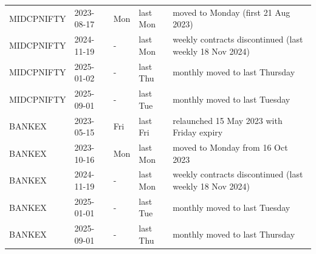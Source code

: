 \begin{tabular}{llllp{6.2cm}}
MIDCPNIFTY & 2023-08-17 & Mon & last Mon & moved to Monday (first 21 Aug 2023) \\
MIDCPNIFTY & 2024-11-19 & - & last Mon & weekly contracts discontinued (last weekly 18 Nov 2024) \\
MIDCPNIFTY & 2025-01-02 & - & last Thu & monthly moved to last Thursday \\
MIDCPNIFTY & 2025-09-01 & - & last Tue & monthly moved to last Tuesday \\
BANKEX & 2023-05-15 & Fri & last Fri & relaunched 15 May 2023 with Friday expiry \\
BANKEX & 2023-10-16 & Mon & last Mon & moved to Monday from 16 Oct 2023 \\
BANKEX & 2024-11-19 & - & last Mon & weekly contracts discontinued (last weekly 18 Nov 2024) \\
BANKEX & 2025-01-01 & - & last Tue & monthly moved to last Tuesday \\
BANKEX & 2025-09-01 & - & last Thu & monthly moved to last Thursday \\
\bottomrule
\end{tabular}